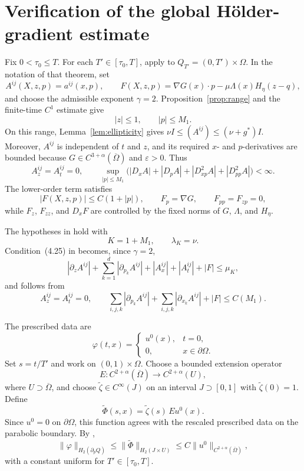 \documentclass[11pt]{article}
\theoremstyle{remark}
\newcommand{\eps}{\varepsilon}
\newcommand{\nupar}{\nu}
\begin{document}
\appendix
\section{Verification of the global H\"older-gradient estimate}
\label{app:gradient-input}

Fix $0<\tau_0\le T$. For each $T'\in[\tau_0,T]$, apply
\cite[Theorem~4.7]{Lieberman1986} to
$Q_{T'}=(0,T')\times\Omega$. In the notation of that theorem, set
\[
A^{ij}(X,z,p)=a^{ij}(x,p),\qquad
F(X,z,p)=\nabla G(x)\cdot p-\mu\Lambda(x)H_\eta(z-q),
\]
and choose the admissible exponent $\gamma=2$. Proposition~\ref{prop:range} and the finite-time $C^1$ estimate give
\[
|z|\le1,\qquad |p|\le M_1.
\]
On this range, Lemma~\ref{lem:ellipticity} gives
$\nupar I\le(A^{ij})\le(\nupar+g^*)I$. Moreover, $A^{ij}$ is independent of $t$ and $z$, and its required
$x$- and $p$-derivatives are bounded because
$G\in C^{3+\alpha}(\overline\Omega)$ and $\eps>0$. Thus
\[
A_z^{ij}=A_t^{ij}=0,\qquad
\sup_{|p|\le M_1}
\bigl(|D_xA|+|D_pA|+|D_{xp}^2A|+|D_{pp}^2A|\bigr)<\infty.
\]
The lower-order term satisfies
\[
|F(X,z,p)|\le C(1+|p|),\qquad
F_p=\nabla G,\qquad F_{pp}=F_{zp}=0,
\]
while $F_z$, $F_{zz}$, and $D_xF$ are controlled by the fixed norms of
$G$, $\Lambda$, and $H_\eta$.

The hypotheses in \cite[(4.17), p.~378]{Lieberman1986} hold with
\[
K=1+M_1,\qquad \lambda_K=\nupar.
\]
Condition~(4.25) in \cite[p.~381]{Lieberman1986} becomes, since
$\gamma=2$,
\[
|\partial_zA^{ij}|+\sum_{k=1}^d|\partial_{p_k}A^{ij}|
+|A_x^{ij}|+|A_t^{ij}|+|F|\le\mu_K,
\]
and follows from
\[
A_z^{ij}=A_t^{ij}=0,\qquad
\sum_{i,j,k}|\partial_{p_k}A^{ij}|
+\sum_{i,j,k}|\partial_{x_k}A^{ij}|+|F|\le C(M_1).
\]

The prescribed data are
\[
\varphi(t,x)=
\begin{cases}
u^0(x),&t=0,\\
0,&x\in\partial\Omega.
\end{cases}
\]
Set $s=t/T'$ and work on $(0,1)\times\Omega$. Choose a bounded extension
operator
\[
E:C^{2+\alpha}(\overline\Omega)\longrightarrow C^{2+\alpha}(U),
\]
where $U\supset\overline\Omega$, and choose
$\widetilde\zeta\in C^\infty(J)$ on an interval $J\supset[0,1]$ with
$\widetilde\zeta(0)=1$. Define
\[
\widetilde\Phi(s,x)=\widetilde\zeta(s)\,Eu^0(x).
\]
Since $u^0=0$ on $\partial\Omega$, this function agrees with the rescaled
prescribed data on the parabolic boundary. By
\cite[p.~350]{Lieberman1986},
\[
\|\varphi\|_{H_2(\partial_pQ)}
\le\|\widetilde\Phi\|_{H_2(J\times U)}
\le C\|u^0\|_{C^{2+\alpha}(\overline\Omega)},
\]
with a constant uniform for $T'\in[\tau_0,T]$.
\end{document}
